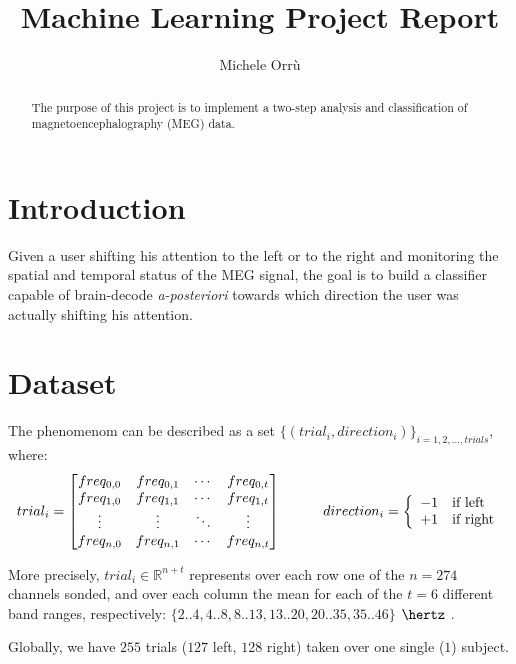\documentclass[10pt]{article}
\title{\textbf{Machine Learning Project Report }}
\author{Michele Orr\`u}
\begin{document}
\maketitle

\begin{abstract}
The purpose of this project is to implement a two-step analysis and classification of magnetoencephalography (MEG) data. 
\end{abstract}



\section{Introduction}
Given a user shifting his attention to the left or to the right and monitoring the spatial and temporal status of the MEG\cite{Biomag2010} signal, the goal is to build a classifier capable of brain-decode \textit{a-posteriori} towards which direction the user was actually shifting his attention.



\section{Dataset}
The phenomenom can be described as a set $\{(trial_i, direction_i)\}_{i= 1, 2, \dots, trials}$, where:
$$
trial_i  = 
 \begin{bmatrix}
   freq_{0, 0} & freq_{0, 1} & \cdots & freq_{0, t}  \\
   freq_{1, 0} & freq_{1, 1} & \cdots & freq_{1, t}  \\
   \vdots      & \vdots      & \ddots & \vdots       \\
   freq_{n, 0} & freq_{n, 1} & \cdots & freq_{n, t} 
 \end{bmatrix}
\hspace{30pt}
 direction_i = \left\{
 \begin{array}{l l}
   -1 & \text{if left}\\
   +1 & \text{if right}\\
 \end{array}\right .
$$

More precisely, $trial_i \in \mathbb{R} ^{n+t}$ represents over each row one of the $n=274$ channels sonded, and over each column the mean for each of the $t=6$ different band ranges, respectively:
$\{2..4, 4..8, 8..13, 13..20, 20..35, 35..46\}$ $\hertz$ .

Globally, we have $255$ trials ($127$ left, $128$ right) taken over one single ($1$) subject.  
\end{document}
